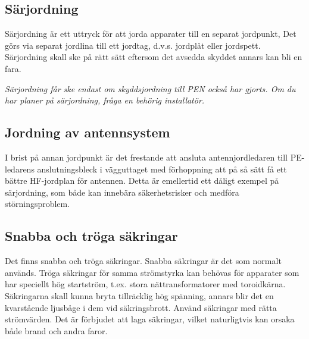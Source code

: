 \subsection{Särjordning}

Särjordning är ett uttryck för att jorda apparater till en separat
jordpunkt, Det görs via separat jordlina till ett jordtag,
d.v.s. jordplåt eller jordspett. Särjordning skall ske på rätt sätt
eftersom det avsedda skyddet annars kan bli en fara.

\emph{Särjordning får ske endast om skyddsjordning till PEN också har
  gjorts. Om du har planer på särjordning, fråga en behörig
  installatör.}

\subsection{Jordning av antennsystem}

I brist på annan jordpunkt är det frestande att ansluta
antennjordledaren till PE-ledarens anslutningsbleck i vägguttaget med
förhoppning att på så sätt få ett bättre HF-jordplan för
antennen. Detta är emellertid ett dåligt exempel på särjordning, som
både kan innebära säkerhetsrisker och medföra störningsproblem.

\subsection{Snabba och tröga säkringar}

Det finns snabba och tröga säkringar. Snabba säkringar är det som
normalt används. Tröga säkringar för samma strömstyrka kan behövas för
apparater som har speciellt hög startström, t.ex. stora
nättransformatorer med toroidkärna. Säkringarna skall kunna bryta
tillräcklig hög spänning, annars blir det en kvarstående ljusbåge i
dem vid säkringsbrott. Använd säkringar med rätta strömvärden. Det är
förbjudet att laga säkringar, vilket naturligtvis kan orsaka både
brand och andra faror.

